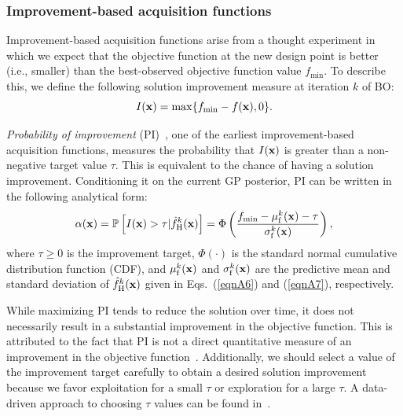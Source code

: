 \documentclass[iicol,sn-basic]{sn-jnl}%
\newcommand{\edit}[1]{\textcolor{red}{#1}} %
\begin{document}
\subsubsection{Improvement-based acquisition functions}\label{Sec511}

Improvement-based acquisition functions arise from a thought experiment in which we expect that the objective function at the new design point is better (i.e., smaller) than the best-observed objective function value $f_\text{min}$.
To describe this, we define the following solution improvement measure at iteration $k$ of BO:
\begin{equation}\label{eqn37}
	I({\bf x}) = \max\{f_\text{min}-f({\bf x}),0\}.
\end{equation}

\textit{Probability of improvement} (PI)~\citep{Kushner1964}, one of the earliest improvement-based acquisition functions, measures the probability that $I({\bf x})$ is greater than a non-negative target value $\tau$.
This is equivalent to the chance of having a solution improvement.
Conditioning it on the current GP posterior, PI can be written in the following analytical form:
\begin{equation}\label{eqn38}
	\alpha({\bf x}) = \mathbb{P}\left[I({\bf x})>\tau|\hat{f}_\text{H}^k({\bf x})\right]=\Phi\left(\frac{f_\text{min}-\mu_\text{f}^k({\bf x})-\tau}{\sigma_\text{f}^k({\bf x})}\right),
\end{equation}
where %
{$\tau \geq 0$ is the improvement target}, $\Phi(\cdot)$ is the standard normal cumulative distribution function (CDF), and $\mu_\text{f}^k({\bf x})$ and $\sigma_\text{f}^k({\bf x})$ are the predictive mean and standard deviation of $\hat{f}_\text{H}^k({\bf x})$ given in Eqs.~(\ref{eqnA6}) and (\ref{eqnA7}), respectively.

While maximizing PI tends to reduce the solution over time, it does not necessarily result in a substantial improvement in the objective function.
This is attributed to the fact that PI is not a direct quantitative measure of an improvement in the objective function~\citep{Kochenderfer2019}.
{Additionally, we should select a value of the improvement target carefully to obtain a desired solution improvement because we favor exploitation for a small $\tau$ or exploration for a large $\tau$.
A data-driven approach to choosing $\tau$ values can be found in~\cite{Jones2001}.}
\end{document}
